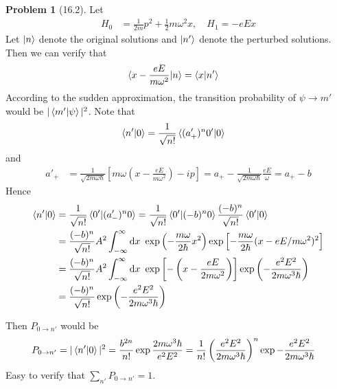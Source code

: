 \documentclass[twoside,11pt]{article}
\renewcommand*\d{\mathop{}\!\mathrm{d}}
\theoremstyle{definition}
\newtheorem{problem}{Problem}
\theoremstyle{remark}
\begin{document}
\begin{problem}[16.2]
Let 
\begin{align*}
    H_0 &= \frac{1}{2m}p^2 + \frac{1}{2}m\omega^2 x,\quad
    H_1 = -eEx
\end{align*}
Let $\ket{n}$ denote the original solutions
and $\ket{n'}$ denote the perturbed solutions.
Then we can verify that
\begin{align*}
    \braket{x-\frac{eE}{m\omega^2}|n} &= 
    \braket{x|n'}
\end{align*}
According to the sudden approximation, the transition probability
of $\psi\rightarrow m'$ would be $|\braket{m'|\psi}|^2$.
Note that
\begin{align*}
    \braket{n'|0} &= 
    \frac{1}{\sqrt{n!}}\braket{(a'_+)^n 0'|0}
\end{align*}
and
\begin{align*}
    a'_+ &= \frac{1}{\sqrt{2m\omega\hbar}}
    \left[m\omega\left(x - \frac{eE}{m\omega^2}\right) - ip\right]
    = a_+ - \frac{1}{\sqrt{2m\omega\hbar}}\frac{eE}{\omega}
    = a_+ - b
\end{align*}
Hence
\begin{align*}
    \braket{n'|0} &= \frac{1}{\sqrt{n!}}\braket{0'|(a'_-)^n0}
    = \frac{1}{\sqrt{n!}}\braket{0'|(-b)^n 0}
    \frac{(-b)^n}{\sqrt{n!}}\braket{0'|0}\\
    &= 
    \frac{(-b)^n}{\sqrt{n!}}A^2
    \int_{-\infty}^\infty\d x\
    \exp\left(-\frac{m\omega}{2\hbar}x^2\right)
    \exp\left[-\frac{m\omega}{2\hbar}(x-eE/m\omega^2)^2\right]\\
    &= \frac{(-b)^n}{\sqrt{n!}}A^2
    \int_{-\infty}^\infty\d x\
    \exp\left[-\left(x-\frac{eE}{2m\omega^2}\right)\right]
    \exp\left(-\frac{e^2E^2}{2m\omega^3 \hbar} \right)\\
    &= \frac{(-b)^n}{\sqrt{n!}}
    \exp\left(-\frac{e^2E^2}{2m\omega^3 \hbar} \right)
\end{align*}

Then $P_{0\rightarrow n'}$ would be
\begin{align*}
    P_{0\rightarrow n'} &= |\braket{n'|0}|^2
    = \frac{b^{2n}}{n!}\exp\frac{2m\omega^3\hbar}{e^2E^2}
    = \frac{1}{n!}\left(\frac{e^2E^2}{2m\omega^3\hbar}\right)^n
    \exp-\frac{e^2E^2}{2m\omega^3\hbar}
\end{align*}
Easy to verify that $\sum_{n'} P_{0\rightarrow n'}=1$.

\end{problem}



\end{document}
